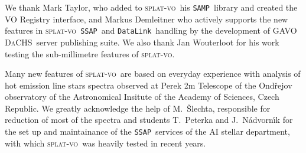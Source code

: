 \documentclass[final,authoryear,5p,times,twocolumn]{elsarticle}
\newcommand{\datalink}{\texttt{DataLink}}
\newcommand{\ssap}{\texttt{SSAP}}
\newcommand{\samp}{\texttt{SAMP}}
\newcommand{\splatvo}{\textsc{splat-vo}}
\newcommand{\dachs}{\textsc{DaCHS}}
\begin{document}
We thank Mark Taylor, who added to
\splatvo\ his \samp\ library and created the VO Registry interface, and
Markus Demleitner who actively supports the new features in \splatvo\ \ssap\
and \datalink\ handling by the development of GAVO \dachs\ server publishing suite.
We also thank Jan Wouterloot for his work testing the sub-millimetre
features of \splatvo.

Many new features of \splatvo\ are based on everyday experience with
analysis of hot emission line stars spectra observed at Perek 2m
Telescope of the Ond\v{r}ejov observatory of the Astronomical Insitute
of the Academy of Sciences, Czech Republic. We greatly acknowledge the
help of M.~\v{S}lechta, responsible for reduction of most of the
spectra and students T.~Peterka and J.~N\'advorn\'\i{}k for the set up
and maintainance of the \ssap\ services of the AI stellar department,
with which \splatvo\ was heavily tested in recent years.









\end{document}
